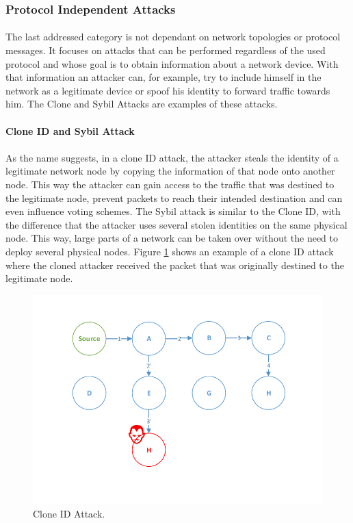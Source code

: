 \subsubsection{Protocol Independent Attacks}
\paragraph{}
The last addressed category is not dependant on network topologies or protocol messages. It focuses on attacks that can be performed regardless of the used protocol and whose goal is to obtain information about a network device. With that information an attacker can, for example, try to include himself in the network as a legitimate device or spoof his identity to forward traffic towards him. The Clone and Sybil Attacks are examples of these attacks.

\paragraph{\textbf{Clone ID and Sybil Attack}}
\paragraph{}
As the name suggests, in a clone ID attack, the attacker steals the identity of a legitimate network node by copying the information of that node onto another node. This way the attacker can gain access to the traffic that was destined to the legitimate node, prevent packets to reach their intended destination and can even influence voting schemes. The Sybil attack is similar to the Clone ID, with the difference that the attacker uses several stolen identities on the same physical node. This way, large parts of a network can be taken over without the need to deploy several physical nodes. Figure \ref{fig:clone_attack} shows an example of a clone ID attack where the cloned attacker received the packet that was originally destined to the legitimate node.

\begin{figure}[h]
  \centering
  \includegraphics[width=0.85\linewidth]{figures/Clone_attack.pdf}
  \caption{Clone ID Attack.}
  \label{fig:clone_attack}
\end{figure} 

